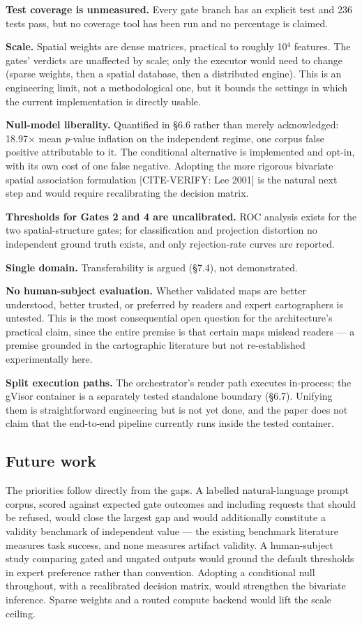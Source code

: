 \textbf{Test coverage is unmeasured.} Every gate branch has an explicit test and 236 tests pass, but no coverage tool has been run and no percentage is claimed.

\textbf{Scale.} Spatial weights are dense matrices, practical to roughly 10$^{4}$ features. The gates' verdicts are unaffected by scale; only the executor would need to change (sparse weights, then a spatial database, then a distributed engine). This is an engineering limit, not a methodological one, but it bounds the settings in which the current implementation is directly usable.

\textbf{Null-model liberality.} Quantified in \S{}6.6 rather than merely acknowledged: 18.97$\times$ mean \emph{p}-value inflation on the independent regime, one corpus false positive attributable to it. The conditional alternative is implemented and opt-in, with its own cost of one false negative. Adopting the more rigorous bivariate spatial association formulation [CITE-VERIFY: Lee 2001] is the natural next step and would require recalibrating the decision matrix.

\textbf{Thresholds for Gates 2 and 4 are uncalibrated.} ROC analysis exists for the two spatial-structure gates; for classification and projection distortion no independent ground truth exists, and only rejection-rate curves are reported.

\textbf{Single domain.} Transferability is argued (\S{}7.4), not demonstrated.

\textbf{No human-subject evaluation.} Whether validated maps are better understood, better trusted, or preferred by readers and expert cartographers is untested. This is the most consequential open question for the architecture's practical claim, since the entire premise is that certain maps mislead readers --- a premise grounded in the cartographic literature but not re-established experimentally here.

\textbf{Split execution paths.} The orchestrator's render path executes in-process; the gVisor container is a separately tested standalone boundary (\S{}6.7). Unifying them is straightforward engineering but is not yet done, and the paper does not claim that the end-to-end pipeline currently runs inside the tested container.

\subsection{Future work}
The priorities follow directly from the gaps. A labelled natural-language prompt corpus, scored against expected gate outcomes and including requests that should be refused, would close the largest gap and would additionally constitute a validity benchmark of independent value --- the existing benchmark literature measures task success, and none measures artifact validity. A human-subject study comparing gated and ungated outputs would ground the default thresholds in expert preference rather than convention. Adopting a conditional null throughout, with a recalibrated decision matrix, would strengthen the bivariate inference. Sparse weights and a routed compute backend would lift the scale ceiling.

